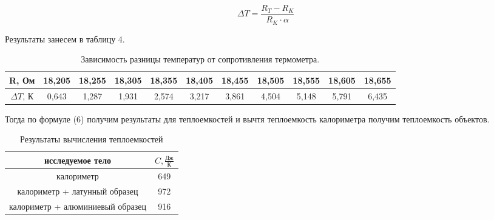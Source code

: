 \documentclass[a4paper, 12pt]{article}%
\begin{document}
	\begin{equation}
		\Delta T = \frac{R_{T} - R_{K}}{R_{K} \cdot \alpha}
	\end{equation}
	
	Результаты занесем в таблицу 4.
	
	\begin{table}[H]
		\centering
		\begin{tabular}{|c|c|c|c|c|c|c|c|c|c|c|}
			\hline
			R, Ом         & 18,205   & 18,255   & 18,305   & 18,355   & 18,405   & 18,455   & 18,505   & 18,555  & 18,605 & 18,655 \\ \hline
			$\Delta T$, К & 0,643 & 1,287 & 1,931 & 2,574 & 3,217 & 3,861 & 4,504 & 5,148 & 5,791 & 6,435\\ \hline
			
		\end{tabular}
		\caption{Зависимость разницы температур от сопротивления термометра.}
		\label{tab:diffrence_between_temperature}
	\end{table}
		Тогда по формуле (6) получим результаты для теплоемкостей и вычтя теплоемкость калориметра получим теплоемкость объектов.
	\begin{table}[h!]
		\centering
		\begin{tabular}{|c|c|}
			\hline
			исследуемое тело                 & $C, \frac{\text{Дж}}{\text{К}}$  \\ \hline
			калориметр                       & 649 \\ \hline	
			калориметр + латунный образец    & 972 \\ \hline
			калориметр + алюминиевый образец & 916 \\ \hline
		\end{tabular}
		\caption{Результаты вычисления теплоемкостей}
		\label{tab:first_results_for_capacity}
	\end{table}
\end{document}
